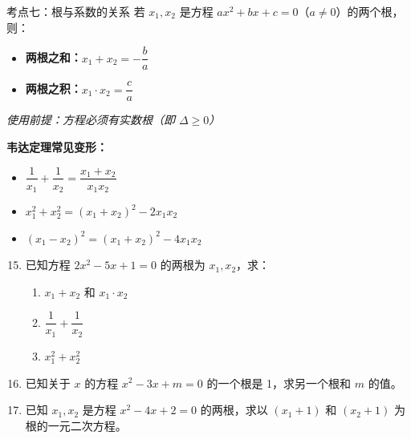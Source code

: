 \documentclass[12pt, a4paper]{article}
\begin{document}
\begin{conceptbox}{考点七：根与系数的关系}
    若 $x_1, x_2$ 是方程 $ax^2 + bx + c = 0$（$a \neq 0$）的两个根，则：
    \begin{itemize}
        \item \textbf{两根之和：}$x_1 + x_2 = -\dfrac{b}{a}$
        \item \textbf{两根之积：}$x_1 \cdot x_2 = \dfrac{c}{a}$
    \end{itemize}
    \textit{使用前提：方程必须有实数根（即 $\Delta \geq 0$）}
\end{conceptbox}

\begin{tipbox}
    \textbf{韦达定理常见变形：}
    \begin{itemize}
        \item $\dfrac{1}{x_1} + \dfrac{1}{x_2} = \dfrac{x_1 + x_2}{x_1 x_2}$
        \item $x_1^2 + x_2^2 = (x_1 + x_2)^2 - 2x_1 x_2$
        \item $(x_1 - x_2)^2 = (x_1 + x_2)^2 - 4x_1 x_2$
    \end{itemize}
\end{tipbox}

\begin{examplebox}
    \begin{enumerate}[label=\textbf{例\arabic*.}]
        \setcounter{enumi}{14}
        \item 已知方程 $2x^2 - 5x + 1 = 0$ 的两根为 $x_1, x_2$，求：
        \begin{enumerate}
            \item[(1)] $x_1 + x_2$ 和 $x_1 \cdot x_2$
            \item[(2)] $\dfrac{1}{x_1} + \dfrac{1}{x_2}$
            \item[(3)] $x_1^2 + x_2^2$
        \end{enumerate}
        
        \item 已知关于 $x$ 的方程 $x^2 - 3x + m = 0$ 的一个根是 1，求另一个根和 $m$ 的值。
        
        \item 已知 $x_1, x_2$ 是方程 $x^2 - 4x + 2 = 0$ 的两根，求以 $(x_1+1)$ 和 $(x_2+1)$ 为根的一元二次方程。
    \end{enumerate}
\end{examplebox}
\end{document}
